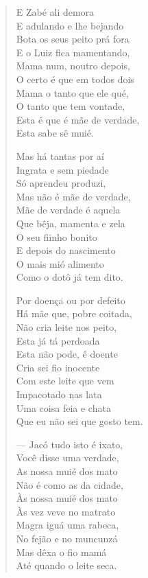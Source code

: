 \begin{verse}
E Zabé ali demora\\
E adulando e lhe bejando\\
Bota os seus peito prá fora\\
E o Luiz fica mamentando,\\
Mama num, noutro depois,\\
O certo é que em todos dois\\
Mama o tanto que ele qué,\\
O tanto que tem vontade,\\
Esta é que é mãe de verdade,\\
Esta sabe sê muié.

Mas há tantas por aí\\
Ingrata e sem piedade\\
Só aprendeu produzi,\\
Mas não é mãe de verdade,\\
Mãe de verdade é aquela\\
Que bêja, mamenta e zela\\
O seu fiinho bonito\\
E depois do nascimento\\
O mais mió alimento\\
Como o dotô já tem dito.

Por doença ou por defeito\\
Há mãe que, pobre coitada,\\
Não cria leite nos peito,\\
Esta já tá perdoada\\
Esta não pode, é doente\\
Cria sei fio inocente\\
Com este leite que vem\\
Impacotado nas lata\\
Uma coisa feia e chata\\
Que eu não sei que gosto tem.

--- Jacó tudo isto é ixato,\\
Você disse uma verdade,\\
As nossa muié dos mato\\
Não é como as da cidade,\\
Às nossa muié dos mato\\
Às vez veve no matrato\\
Magra iguá uma rabeca,\\
No fejão e no muncunzá\\
Mas dêxa o fio mamá\\
Até quando o leite seca.


\end{verse}
